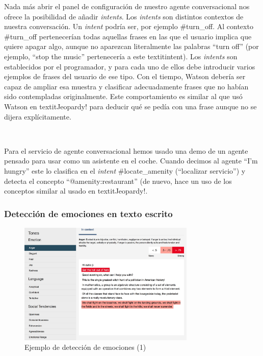 \documentclass[paper=a4, fontsize=10pt]{scrartcl} %
\numberwithin{equation}{section} %
\numberwithin{figure}{section} %
\numberwithin{table}{section} %
\begin{document}
Nada más abrir el panel de configuración de nuestro agente conversacional nos ofrece la posibilidad de añadir \textit{intents}. Los \textit{intents} son distintos contextos de nuestra conversación. Un \textit{intent} podría ser, por ejemplo \#turn\_off. Al contexto \#turn\_off pertenecerían todas aquellas frases en las que el usuario implica que quiere apagar algo, aunque no aparezcan literalmente las palabras ``turn off'' (por ejemplo, ``stop the music'' pertenecería a este textit{intent}). Los \textit{intents} son establecidos por el programador, y para cada uno de ellos debe introducir varios ejemplos de frases del usuario de ese tipo. Con el tiempo, Watson debería ser capaz de ampliar esa muestra y clasificar adecuadamente frases que no habían sido contempladas originalmente. Este comportamiento es similar al que usó Watson en textit{Jeopardy!} para deducir qué se pedía con una frase aunque no se dijera explícitamente.

\

Para el servicio de agente conversacional hemos usado una demo de un agente pensado para usar como un asistente en el coche. Cuando decimos al agente ``I'm hungry'' este lo clasifica en el \textit{intent} \#locate\_amenity (``localizar servicio'') y detecta el concepto ``@amenity:restaurant'' (de nuevo, hace un uso de los conceptos similar al usado en textit{Jeopardy!}.

\subsubsection{Detección de emociones en texto escrito}

\begin{figure}[H]
			\centering
			\label{anger.jpg}
			\includegraphics[width=0.75\textwidth]{./Imagenes/anger.jpeg}
			\caption{Ejemplo de detección de emociones (1)}
\end{figure}
\end{document}
